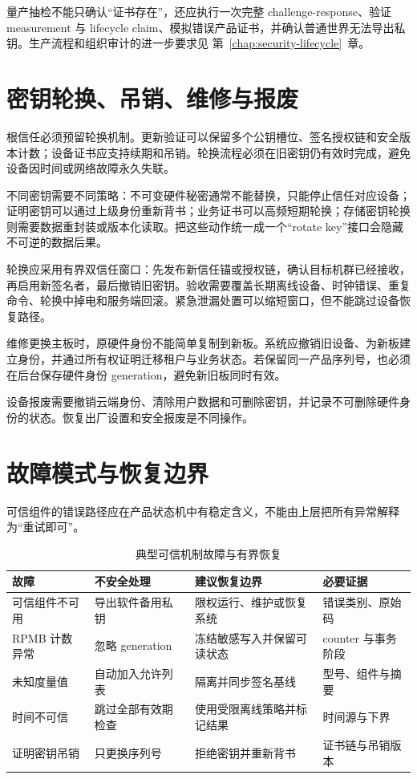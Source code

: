 量产抽检不能只确认“证书存在”，还应执行一次完整 challenge-response、验证 measurement 与 lifecycle claim、模拟错误产品证书，并确认普通世界无法导出私钥。生产流程和组织审计的进一步要求见 \mbox{第~\ref{chap:security-lifecycle}~章}。

\section{密钥轮换、吊销、维修与报废}

根信任必须预留轮换机制。更新验证可以保留多个公钥槽位、签名授权链和安全版本计数；设备证书应支持续期和吊销。轮换流程必须在旧密钥仍有效时完成，避免设备因时间或网络故障永久失联。

不同密钥需要不同策略：不可变硬件秘密通常不能替换，只能停止信任对应设备；证明密钥可以通过上级身份重新背书；业务证书可以高频短期轮换；存储密钥轮换则需要数据重封装或版本化读取。把这些动作统一成一个“rotate key”接口会隐藏不可逆的数据后果。

轮换应采用有界双信任窗口：先发布新信任锚或授权链，确认目标机群已经接收，再启用新签名者，最后撤销旧密钥。验收需要覆盖长期离线设备、时钟错误、重复命令、轮换中掉电和服务端回滚。紧急泄漏处置可以缩短窗口，但不能跳过设备恢复路径。

维修更换主板时，原硬件身份不能简单复制到新板。系统应撤销旧设备、为新板建立身份，并通过所有权证明迁移租户与业务状态。若保留同一产品序列号，也必须在后台保存硬件身份 generation，避免新旧板同时有效。

设备报废需要撤销云端身份、清除用户数据和可删除密钥，并记录不可删除硬件身份的状态。恢复出厂设置和安全报废是不同操作。

\section{故障模式与恢复边界}

可信组件的错误路径应在产品状态机中有稳定含义，不能由上层把所有异常解释为“重试即可”。

\begin{table}[H]
  \centering
  \caption{典型可信机制故障与有界恢复}
  \begin{tabular}{p{28mm}p{38mm}p{42mm}p{27mm}}
    \hline
    故障 & 不安全处理 & 建议恢复边界 & 必要证据 \\
    \hline
    可信组件不可用 & 导出软件备用私钥 & 限权运行、维护或恢复系统 & 错误类别、原始码 \\
    RPMB 计数异常 & 忽略 generation & 冻结敏感写入并保留可读状态 & counter 与事务阶段 \\
    未知度量值 & 自动加入允许列表 & 隔离并同步签名基线 & 型号、组件与摘要 \\
    时间不可信 & 跳过全部有效期检查 & 使用受限离线策略并标记结果 & 时间源与下界 \\
    证明密钥吊销 & 只更换序列号 & 拒绝密钥并重新背书 & 证书链与吊销版本 \\
    \hline
  \end{tabular}
\end{table}

